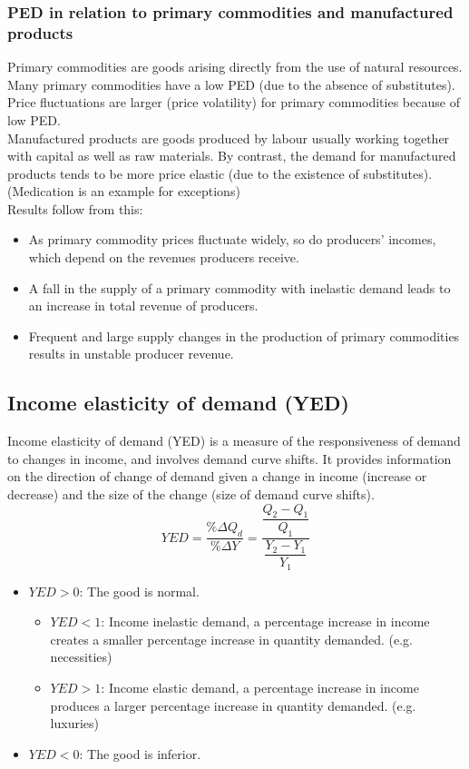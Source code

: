\documentclass[a4paper,12pt]{article}
\begin{document}
\subsubsection*{PED in relation to primary commodities and manufactured products}
Primary commodities are goods arising directly from the use of natural resources. Many primary commodities have a low PED (due to the absence of substitutes). Price fluctuations are larger (price volatility) for primary commodities because of low PED.\\
Manufactured products are goods produced by labour usually working together with capital as well as raw materials. By contrast, the demand for manufactured products tends to be more price elastic (due to the existence of substitutes). (Medication is an example for exceptions)\\
Results follow from this:
\begin{itemize}
  \item As primary commodity prices fluctuate widely, so do producers' incomes, which depend on the revenues producers receive.
  \item A fall in the supply of a primary commodity with inelastic demand leads to an increase in total revenue of producers.
  \item Frequent and large supply changes in the production of primary commodities results in unstable producer revenue.
\end{itemize}
\subsection{Income elasticity of demand (YED)}
Income elasticity of demand (YED) is a measure of the responsiveness of demand to changes
in income, and involves demand curve shifts. It provides information on the direction of change of demand given a change in income (increase or decrease) and the size of the change (size of demand curve shifts).
\[YED=\dfrac{\%\Delta Q_d}{\%\Delta Y}=\dfrac{\dfrac{Q_2-Q_1}{Q_1}}{\dfrac{Y_2-Y_1}{Y_1}}\]
\begin{itemize}
  \item $YED>0$: The good is normal.
  \begin{itemize}
    \item $YED<1$: Income inelastic demand, a percentage increase in income creates a smaller percentage increase in quantity demanded. (e.g. necessities)
    \item $YED>1$: Income elastic demand, a percentage increase in income produces a larger percentage increase in quantity demanded. (e.g. luxuries)
  \end{itemize}
  \item $YED<0$: The good is inferior.
\end{itemize}
\end{document}
